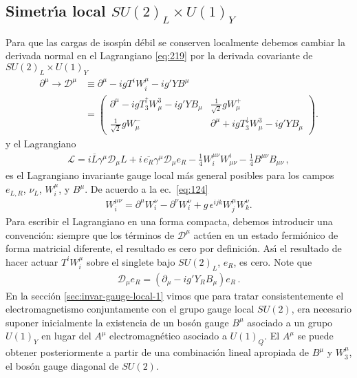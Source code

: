 \subsection*{Simetr\'\i a local $SU(2)_L\times U(1)_Y$}
\label{sec:simetr-local-su2_l}
Para que las cargas de isosp\'\i n d\'ebil se conserven localmente debemos cambiar la derivada normal en el Lagrangiano \eqref{eq:219} por la derivada covariante de $SU(2)_L\times U(1)_Y$
\begin{align}
  \label{eq:125}
  \partial^\mu\to\mathcal{D}^\mu&\equiv\partial^\mu-igT^iW^\mu_i-ig'YB^\mu\nonumber\\
&=  \begin{pmatrix}
    \partial^\mu-igT_3^\uparrow W^3_\mu-ig'YB_\mu&\frac{1}{\sqrt{2}}gW^+_\mu\\
    \frac{1}{\sqrt{2}}gW^-_\mu&\partial^\mu+igT_3^\downarrow W^3_\mu-ig'YB_\mu
  \end{pmatrix}.
\end{align}
y el Lagrangiano
\begin{align}
  \label{eq:220}
   \mathcal{L}=i\overline{L}\gamma^\mu\mathcal{D}_\mu L+i\,\overline{e_R}\gamma^\mu\mathcal{D}_\mu e_R
-\tfrac{1}{4}W^{\mu\nu}_i W_{\mu\nu}^i-\tfrac{1}{4}B^{\mu\nu} B_{\mu\nu}\,,
\end{align}
es el Lagrangiano invariante gauge local m\'as general posibles para los campos $e_{L,R}$, $\nu_L$, $W^\mu_i$, y $B^\mu$. De acuerdo a la ec.~\eqref{eq:124}
\begin{align}
  W^{\mu\nu}_i=\partial^\mu W^\nu_i -\partial^\nu W^\nu_i+g\,\epsilon^{ijk}W^\mu_j W^\nu_k.
\end{align}
Para escribir el Lagrangiano en una forma compacta, debemos introducir una convenci\'on: siempre que los t\'erminos de $\mathcal{D}^\mu$ act\'uen en un estado fermi\'onico de forma matricial diferente, el resultado es cero por definici\'on. As\'\i{} el resultado de hacer actuar $T^iW^\mu_i$ sobre el singlete bajo $SU(2)_L$, $e_R$, es cero. Note que
\begin{align}
  \mathcal{D}_\mu e_R=(\partial_\mu-ig' Y_R B_\mu)e_R\,.
\end{align}
En la secci\'on \ref{sec:invar-gauge-local-1} vimos que para tratar consistentemente el electromagnetismo conjuntamente con el grupo gauge local $SU(2)$, era necesario suponer inicialmente la existencia de un bos\'on gauge $B^\mu$ asociado a un grupo $U(1)_Y$ en lugar del $A^\mu$ electromagn\'etico asociado a $U(1)_Q$. El $A^\mu$ se puede obtener posteriormente a partir de una combinaci\'on lineal apropiada de $B^\mu$ y $W^\mu_3$, el bos\'on gauge diagonal de $SU(2)$. 

